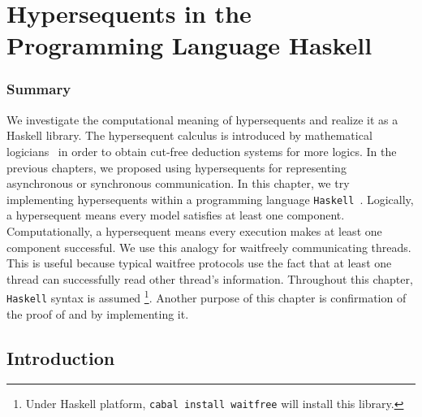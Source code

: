 \chapter{Hypersequents in the Programming Language Haskell}
\label{ch:haskell}

\subsection{Summary}

 We investigate the computational meaning of hypersequents and realize
 it as a Haskell library.
 The hypersequent calculus is introduced by mathematical
 logicians~\citep{avron91,alg,metcalfe2006} in order
 to obtain cut-free deduction systems for more logics.
 In the previous chapters, we proposed using hypersequents
 for representing asynchronous or synchronous communication.
 In this chapter, we try implementing hypersequents within a programming
 language \texttt{Haskell}~\citep{marlow2010haskell}.
 Logically, a hypersequent
 means every model satisfies at least one component.
 Computationally, a hypersequent
 means every execution makes at least one component
 successful.
 We use this analogy
 for waitfreely communicating threads.  This is useful
 because typical waitfree protocols use the fact that at least one thread
 can successfully read other thread's information.
 Throughout this chapter, \texttt{Haskell} syntax is assumed%
 \footnote{Under Haskell platform,
 \texttt{cabal install waitfree} will install this library.}.
 Another purpose of this chapter is confirmation of the proof of
  and  by implementing it.

\iffalse
\begin{code}
 {-# LANGUAGE TypeOperators, MultiParamTypeClasses, FunctionalDependencies, FlexibleInstances, UndecidableInstances #-}

module Control.Concurrent.Waitfree
    ( ZeroT
    , SucT
    , HNil
    , HCons
    , (:*:)
    , K
    , single
    , Thread (t, atid)
    , AbstractThreadId
    , peek
    , comm
    , follows
    , execute
    , choice
    , cycling
    , exchange
    , (-*-)
    )
    where

import Control.Concurrent (ThreadId, forkIO, killThread)
import Control.Concurrent.MVar (MVar, tryPutMVar, readMVar,
 newEmptyMVar, tryTakeMVar)
import qualified Data.Map as Map
\end{code}
\fi

\section{Introduction}

